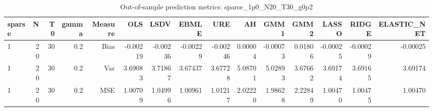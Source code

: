 \begin{table}[!htbp]\centering
\caption{Out-of-sample prediction metrics: sparse_1p0_N20_T30_g0p2}
\label{tab:table3_sparse_1p0_N20_T30_g0p2}
\begin{tabular}{lrrrrrrrrrrrrrr}
\hline
sparse & N & T0 & gamma & Measure & OLS & LSDV & EBMLE & URE & AH & GMM1 & GMM2 & LASSO & RIDGE & ELASTIC_NET \\
\hline
1 & 20 & 30 & 0.2 & Bias & -0.00219 & -0.00236 & -0.00229 & -0.00246 & 0.00004 & -0.00073 & 0.01806 & -0.00025 & -0.00029 & -0.00025 \\
1 & 20 & 30 & 0.2 & Var & 3.69083 & 3.71867 & 3.67437 & 3.67728 & 5.08701 & 5.02893 & 3.67662 & 3.69174 & 3.69165 & 3.69174 \\
1 & 20 & 30 & 0.2 & MSE & 1.00709 & 1.04996 & 1.00961 & 1.01217 & 2.02220 & 1.98628 & 2.22849 & 1.00470 & 1.00475 & 1.00470 \\
\hline
\end{tabular}
\end{table}

